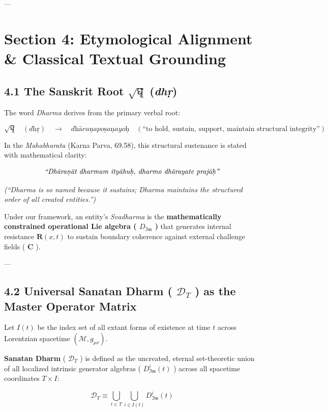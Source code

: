 \documentclass[11pt,a4paper]{article}
\theoremstyle{definition}
\theoremstyle{remark}
\begin{document}
---

\section{Section 4: Etymological Alignment \& Classical Textual Grounding}

\subsection{4.1 The Sanskrit Root $\sqrt{\text{धृ}}$ (\textit{dhṛ})}
The word \textit{Dharma} derives from the primary verbal root:


\begin{equation}
\sqrt{\text{धृ}} \quad (\textit{dhṛ}) \quad \longrightarrow \quad \textit{dhāraṇapoṣaṇayoḥ} \quad (\text{“to hold, sustain, support, maintain structural integrity”})
\end{equation}


In the \textit{Mahabharata} (Karna Parva, 69.58), this structural sustenance is stated with mathematical clarity:


\begin{equation}
\text{\textit{“Dhāraṇāt dharmam ityāhuḥ, dharmo dhārayate prajāḥ”}}
\end{equation}


\textit{(“Dharma is so named because it sustains; Dharma maintains the structured order of all created entities.”)}

Under our framework, an entity's \textit{Svadharma} is the \textbf{mathematically constrained operational Lie algebra ( $D_{\mathfrak{Im}}$ )} that generates internal resistance $\mathbf{R}(x, t)$ to sustain boundary coherence against external challenge fields ( $\mathbf{C}$ ).

---

\subsection{4.2 Universal Sanatan Dharm ( $\mathcal{D}_T$ ) as the Master Operator Matrix}
Let $I(t)$ be the index set of all extant forms of existence at time $t$ across Lorentzian spacetime $(\mathcal{M}, g_{\mu\nu})$.

\textbf{Sanatan Dharm} ( $\mathcal{D}_T$ ) is defined as the uncreated, eternal set-theoretic union of all localized intrinsic generator algebras ( $D_{\mathfrak{Im}}^i(t)$ ) across all spacetime coordinates $T \times I$:


\begin{equation}
\mathcal{D}_T \equiv \bigcup_{t \in T} \bigcup_{i \in I(t)} D_{\mathfrak{Im}}^i(t)
\end{equation}
\end{document}
